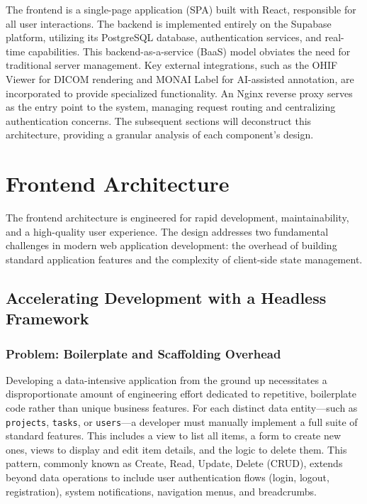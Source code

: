 The frontend is a single-page application (SPA) built with React, responsible for all user interactions. The backend is implemented entirely on the Supabase platform, utilizing its PostgreSQL database, authentication services, and real-time capabilities. This backend-as-a-service (BaaS) model obviates the need for traditional server management. Key external integrations, such as the OHIF Viewer for DICOM rendering and MONAI Label for AI-assisted annotation, are incorporated to provide specialized functionality. An Nginx reverse proxy serves as the entry point to the system, managing request routing and centralizing authentication concerns. The subsequent sections will deconstruct this architecture, providing a granular analysis of each component's design.

\section{Frontend Architecture}
\label{sec:frontend_architecture}

The frontend architecture is engineered for rapid development, maintainability, and a high-quality user experience. The design addresses two fundamental challenges in modern web application development: the overhead of building standard application features and the complexity of client-side state management.

\subsection{Accelerating Development with a Headless Framework}
\label{subsec:accelerating_development}

\subsubsection{Problem: Boilerplate and Scaffolding Overhead}
Developing a data-intensive application from the ground up necessitates a disproportionate amount of engineering effort dedicated to repetitive, boilerplate code rather than unique business features. For each distinct data entity—such as \texttt{projects}, \texttt{tasks}, or \texttt{users}—a developer must manually implement a full suite of standard features. This includes a view to list all items, a form to create new ones, views to display and edit item details, and the logic to delete them. This pattern, commonly known as Create, Read, Update, Delete (CRUD), extends beyond data operations to include user authentication flows (login, logout, registration), system notifications, navigation menus, and breadcrumbs.

